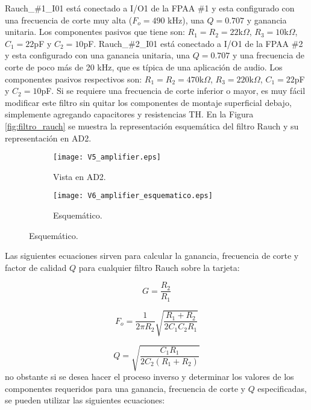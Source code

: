 	Rauch\_\#1\_I01 está conectado a I/O1 de la FPAA \#1 y esta configurado con una frecuencia de corte muy alta ($F_{o} = 490$ kHz), una $Q = 0.707$ y ganancia unitaria. Los componentes pasivos que tiene son: $R_{1} = R_{2} = 22$k$\Omega$, $R_{3} = 10$k$\Omega$, $C_{1} = 22$pF y $C_{2} = 10$pF.  Rauch\_\#2\_I01 está conectado a I/O1 de la FPAA \#2 y esta configurado con una ganancia unitaria, una $Q = 0.707$ y una frecuencia de corte de poco más de 20 kHz, que es típica de una aplicación de audio. Los componentes pasivos respectivos son: $R_{1} = R_{2} = 470$k$\Omega$, $R_{3} = 220$k$\Omega$, $C_{1} = 22$pF y $C_{2} = 10$pF. Si se requiere una frecuencia de corte inferior o mayor, es muy fácil modificar este filtro sin quitar los componentes de montaje superficial debajo, simplemente agregando capacitores y resistencias TH. En la Figura \ref{fig:filtro_rauch} se muestra la representación esquemática del filtro Rauch y su representación en AD2.
	
	\begin{figure}[!ht]
	\centering   
	\caption{Diferentes representaciones de filtro Rauch.}
	\label{fig:filtro_rauch}
		\begin{subfigure}{0.3\textwidth}
			\centering   
			\texttt{[image: V5\_amplifier.eps]}
			\caption{Vista en AD2.}
			\label{fig:V5_amplifier}
		\end{subfigure}
		\begin{subfigure}{0.65\textwidth}
			\centering   
			\texttt{[image: V6\_amplifier\_esquematico.eps]}
			\caption{Esquemático.}
			\label{fig:V6_amplifier_esquematico}
		\end{subfigure}
	\end{figure}

	Las siguientes ecuaciones sirven para calcular la ganancia, frecuencia de corte y factor de calidad $Q$ para cualquier filtro Rauch sobre la tarjeta:
	
	\begin{equation}
		G = \frac{R_{2}}{R_{1}}
	\end{equation}
	
	\begin{equation}
		F_{o} = \frac{1}{2 \pi R_{2}} \sqrt{ \frac{R_{1}+ R_{2} }{2 C_{1} C_{2} R_{1}}}
	\end{equation}
	
	\begin{equation}
		Q = \sqrt{\frac{C_{1} R_{1}}{2 C_{2} (R_{1} + R_{2})}}
	\end{equation}
	no obstante si se desea hacer el proceso inverso y determinar los valores de los componentes requeridos para una ganancia, frecuencia de corte y $Q$ especificadas, se pueden utilizar las siguientes ecuaciones: 
	
